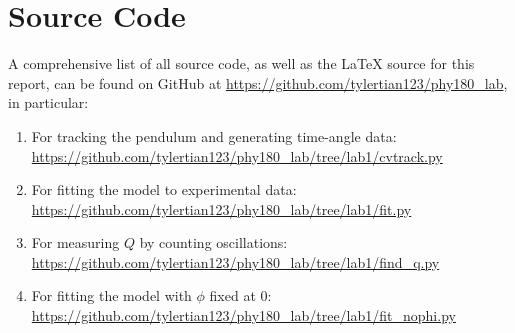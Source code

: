 \documentclass[aps,twocolumn,secnumarabic,nobalancelastpage,amsmath,amssymb,nofootinbib,letterpaper]{revtex4}
\begin{document}

\appendix
\section{Source Code}

A comprehensive list of all source code, as well as the \LaTeX{} source for this report, can be found on GitHub at
\url{https://github.com/tylertian123/phy180_lab}, in particular:
\label{appendix:code}
\begin{enumerate}
    \item For tracking the pendulum and generating time-angle data: \url{https://github.com/tylertian123/phy180_lab/tree/lab1/cvtrack.py}
    \item For fitting the model to experimental data: \url{https://github.com/tylertian123/phy180_lab/tree/lab1/fit.py}
    \item For measuring \(Q\) by counting oscillations: \url{https://github.com/tylertian123/phy180_lab/tree/lab1/find_q.py}
    \item For fitting the model with \(\phi\) fixed at 0: \url{https://github.com/tylertian123/phy180_lab/tree/lab1/fit_nophi.py}
\end{enumerate}
\end{document}
